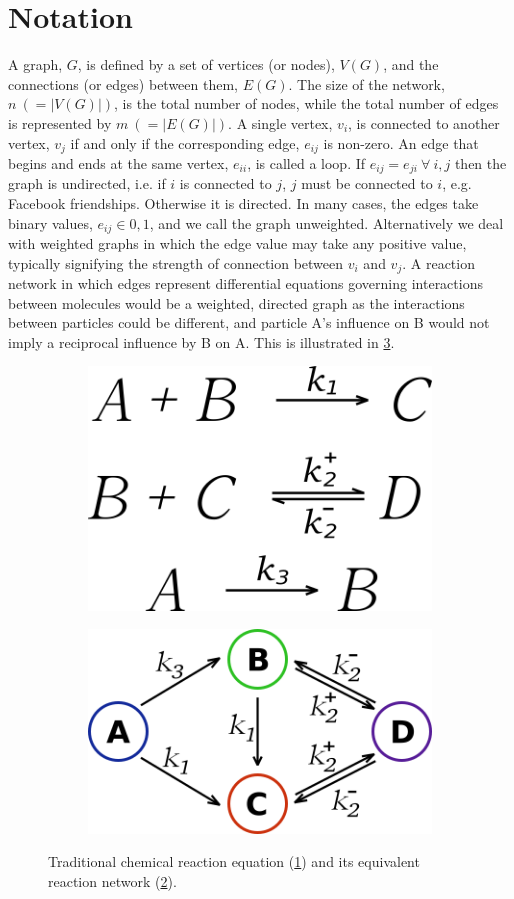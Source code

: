 \documentclass[11pt]{article}
\begin{document}
\section{Notation}
\label{sec:notation}
\indent A graph, $G$, is defined by a set of vertices (or nodes), $V(G)$, and the connections (or edges) between them, $E(G)$. The size of the network, $n \ ( = |V(G)|)$, is the total number of nodes, while the total number of edges is represented by $m \ (= |E(G)|)$. A single vertex, $v_{i}$, is connected to another vertex, $v_{j}$ if and only if the corresponding edge, $e_{ij}$ is non-zero. An edge that begins and ends at the same vertex, $e_{ii}$, is called a loop. If $e_{ij} = e_{ji} \ \forall \ i,j$ then the graph is undirected, i.e. if $i$ is connected to $j$, $j$ must be connected to $i$, e.g. Facebook friendships. Otherwise it is directed. In many cases, the edges take binary values, $e_{ij} \in {0,1}$, and we call the graph unweighted. Alternatively we deal with weighted graphs in which the edge value may take any positive value, typically signifying the strength of connection between $v_{i}$ and $v_{j}$. A reaction network in which edges represent differential equations governing interactions between molecules would be a weighted, directed graph as the interactions between particles could be different, and particle A's influence on B would not imply a reciprocal influence by B on A. This is illustrated in \ref{fig:rxn}. \vspace{1mm}
\begin{figure}[h!]
  \centering
  \begin{subfigure}{.5\textwidth}
    \centering
    \includegraphics[width=.4\linewidth]{rxnSchematic}
    \caption{}
    \label{fig:rxnSchematic}
  \end{subfigure}%
  \begin{subfigure}{.5\textwidth}
    \centering
    \includegraphics[width=.8\linewidth]{rxnNetwork}
    \caption{}
    \label{fig:rxnNetwork}
  \end{subfigure}%
  \caption{Traditional chemical reaction equation (\ref{fig:rxnSchematic}) and its equivalent reaction network (\ref{fig:rxnNetwork}).}
  \label{fig:rxn}
\end{figure}
\end{document}
